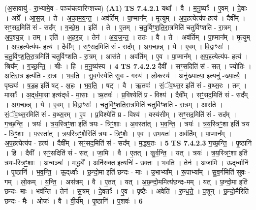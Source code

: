 \documentclass[17pt]{extarticle}
\begin{document}
                  \newline
                      (अ॒सावायु॑ - रा॒भ्यामे॒व - पञ्च॑चत्वारिꣳशच्च)  \textbf{(A1)} \newline \newline
                                \textbf{ TS 7.4.2.1} \newline
                  यथा᳚ । वै । म॒नु॒ष्याः᳚ । ए॒वम् । दे॒वाः । अग्रे᳚ । आ॒स॒न्न् । ते । अ॒का॒म॒य॒न्त॒ । अव॑र्तिम् । पा॒प्मान᳚म् । मृ॒त्युम् । अ॒प॒हत्येत्य॑प-हत्य॑ । दैवी᳚म् । सꣳ॒॒सद॒मिति॑ सं - सद᳚म् । ग॒च्छे॒म॒ । इति॑ । ते । ए॒तम् । च॒तु॒र्विꣳ॒॒श॒ति॒रा॒त्रमिति॑ चतुर्विꣳशति - रा॒त्रम् । अ॒प॒श्य॒न्न् । तम् । एति॑ । अ॒ह॒र॒न्न् । तेन॑ । अ॒य॒ज॒न्त॒ । ततः॑ । वै । ते । अव॑र्तिम् । पा॒प्मान᳚म् । मृ॒त्युम् । अ॒प॒हत्येत्य॑प- हत्य॑ । दैवी᳚म् । सꣳ॒॒सद॒मिति॑ सं - सद᳚म् । अ॒ग॒च्छ॒न्न् । ये । ए॒वम् । वि॒द्वाꣳसः॑ । च॒तु॒र्विꣳ॒॒श॒ति॒रा॒त्रमिति॑ चतुर्विꣳशति - रा॒त्रम् । आस॑ते । अव॑र्तिम् । ए॒व । पा॒प्मान᳚म् । अ॒प॒हत्येत्य॑प- हत्य॑ । श्रिय᳚म् । ग॒च्छ॒न्ति॒ । श्रीः । हि । म॒नु॒ष्य॑स्य । \textbf{  4} \newline
                  \newline
                                \textbf{ TS 7.4.2.2} \newline
                  दैवी᳚ । सꣳ॒॒सदिति॑ सं - सत् । ज्योतिः॑ । अ॒ति॒रा॒त्र इत्य॑ति - रा॒त्रः । भ॒व॒ति॒ । सु॒व॒र्गस्येति॑ सुवः - गस्य॑ । लो॒कस्य॑ । अनु॑ख्यात्या॒ इत्यनु॑ -ख्या॒त्यै॒ । पृष्ठ्यः॑ । ष॒ड॒ह इति॑ षट् - अ॒हः । भ॒व॒ति॒ । षट् । वै । ऋ॒तवः॑ । सं॒ॅव॒थ्स॒र इति॑ सं - व॒थ्स॒रः । तम् । मासाः᳚ । अ॒द्‌र्ध॒मा॒सा इत्य॑द्‌र्ध - मा॒साः । ऋ॒तवः॑ । प्र॒विश्येति॑ प्र - विश्य॑ । दैवी᳚म् । सꣳ॒॒सद॒मिति॑ सं - सद᳚म् । अ॒ग॒च्छ॒न्न् । ये । ए॒वम् । वि॒द्वाꣳसः॑ । च॒तु॒र्विꣳ॒॒श॒ति॒रा॒त्रमिति॑ चतुर्विꣳशति - रा॒त्रम् । आस॑ते । सं॒ॅव॒थ्स॒रमिति॑ सं - व॒थ्स॒रम् । ए॒व । प्र॒विश्येति॑ प्र - विश्य॑ । वस्य॑सीम् । सꣳ॒॒सद॒मिति॑ सं - सद᳚म् । ग॒च्छ॒न्ति॒ । त्रयः॑ । त्र॒य॒स्त्रिꣳ॒॒शा इति॑ त्रयः - त्रिꣳ॒॒शाः । अ॒वस्ता᳚त् । भ॒व॒न्ति॒ । त्रयः॑ । त्र॒य॒स्त्रिꣳ॒॒शा इति॑ त्रय - त्रिꣳ॒॒शाः । प॒रस्ता᳚त् । त्र॒य॒स्त्रिꣳ॒॒शैरिति॑ त्रयः - त्रिꣳ॒॒शैः । ए॒व । उ॒भ॒यतः॑ । अव॑र्तिम् । पा॒प्मान᳚म् । अ॒प॒हत्येत्य॑प - हत्य॑ । दैवी᳚म् । सꣳ॒॒सद॒मिति॑ सं - सद᳚म् । म॒द्ध्य॒तः । \textbf{  5} \newline
                  \newline
                                \textbf{ TS 7.4.2.3} \newline
                  ग॒च्छ॒न्ति॒ । पृ॒ष्ठानि॑ । हि । दैवी᳚ । सꣳ॒॒सदिति॑ सं - सत् । जा॒मि । वै । ए॒तत् । कु॒र्व॒न्ति॒ । यत् । त्रयः॑ । त्र॒य॒स्त्रिꣳ॒॒शा इति॑ त्रयः-स्त्रिꣳ॒॒शाः । अ॒न्वञ्चः॑ । मद्ध्ये᳚ । अनि॑रुक्त॒ इत्यनिः॑ - उ॒क्तः॒ । भ॒व॒ति॒ । तेन॑ । अजा॑मि । ऊ॒द्‌र्ध्वानि॑ । पृ॒ष्ठानि॑ । भ॒व॒न्ति॒ । ऊ॒द्‌र्ध्वाः । छ॒न्दो॒मा इति॑ छन्दः - माः । उ॒भाभ्या᳚म् । रू॒पाभ्या᳚म् । सु॒व॒र्गमिति॑ सुवः - गम् । लो॒कम् । य॒न्ति॒ । अस॑त्रम् । वै । ए॒तत् । यत् । अ॒छ॒न्दो॒ममित्य॑छन्दः-मम् । यत् । छ॒न्दो॒मा इति॑ छन्दः- माः । भव॑न्ति । तेन॑ । स॒त्रम् । दे॒वताः᳚ । ए॒व । पृ॒ष्ठैः । अवेति॑ । रु॒न्ध॒ते॒ । प॒शून् । छ॒न्दो॒मैरिति॑ छन्दः - मैः । ओजः॑ । वै । वी॒र्य᳚म् । पृ॒ष्ठानि॑ । प॒शवः॑ । \textbf{  6} \newline
\end{document}
